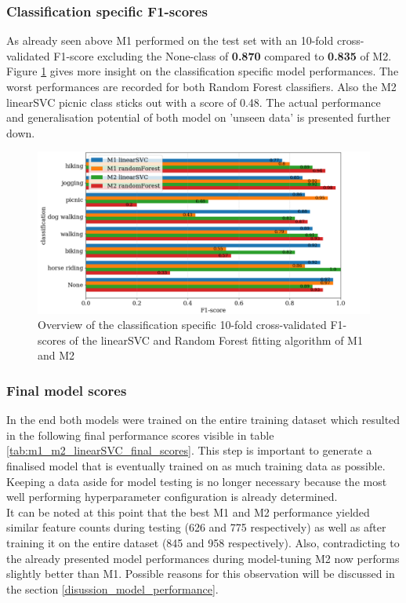 \subsubsection{Classification specific F1-scores}
As already seen above M1 performed on the test set with an 10-fold cross-validated F1-score excluding the None-class of \textbf{0.870} compared to \textbf{0.835} of M2. Figure \ref{fig:m1_m2_class_f1_scores} gives more insight on the classification specific model performances. The worst performances are recorded for both Random Forest classifiers. Also the M2 linearSVC picnic class sticks out with a score of 0.48. The actual performance and generalisation potential of both model on 'unseen data' is presented further down.
\begin{figure}[h!]
   \centering
   \includegraphics[width=\textwidth]{img/m1_m2_class_f1_scores_bigger_font.pdf}
   \caption{Overview of the classification specific 10-fold cross-validated F1-scores of the linearSVC and Random Forest fitting algorithm of M1 and M2}
   \label{fig:m1_m2_class_f1_scores}
\end{figure}

\subsubsection{Final model scores}
In the end both models were trained on the entire training dataset which resulted in the following final performance scores visible in table \ref{tab:m1_m2_linearSVC_final_scores}. This step is important to generate a finalised model that is eventually trained on as much training data as possible. Keeping a data aside for model testing is no longer necessary because the most well performing hyperparameter configuration is already determined.\\
It can be noted at this point that the best M1 and M2 performance yielded similar feature counts during testing (626 and 775 respectively) as well as after training it on the entire dataset (845 and 958 respectively). Also, contradicting to the already presented model performances during model-tuning M2 now performs slightly better than M1. Possible reasons for this observation will be discussed in the section \ref{disussion_model_performance}.

